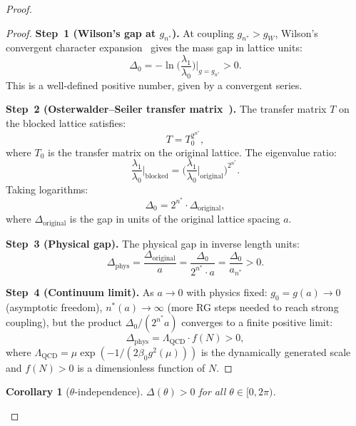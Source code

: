 \documentclass[12pt,a4paper]{article}
\theoremstyle{plain}
\newtheorem{corollary}[theorem]{Corollary}
\theoremstyle{definition}
\theoremstyle{remark}
\begin{document}
\begin{proof}
\begin{proof}
\textbf{Step~1 (Wilson's gap at $g_{n^*}$).} At coupling $g_{n^*}>g_W$, Wilson's convergent character expansion~\cite{Wilson1974} gives the mass gap in lattice units:
\begin{equation}\label{eq:Delta0}
\Delta_0 = -\ln\!\Big(\frac{\lambda_1}{\lambda_0}\Big)\bigg|_{g=g_{n^*}} > 0.
\end{equation}
This is a well-defined positive number, given by a convergent series.

\textbf{Step~2 (Osterwalder--Seiler transfer matrix~\cite{OsterwalderSeiler1978}).} The transfer matrix $T$ on the blocked lattice satisfies:
\begin{equation}\label{eq:OS_transfer}
T = T_0^{2^{n^*}},
\end{equation}
where $T_0$ is the transfer matrix on the original lattice. The eigenvalue ratio:
\begin{equation}\label{eq:eigenratio}
\frac{\lambda_1}{\lambda_0}\bigg|_{\text{blocked}} = \bigg(\frac{\lambda_1}{\lambda_0}\bigg|_{\text{original}}\bigg)^{\!2^{n^*}}.
\end{equation}
Taking logarithms:
\begin{equation}\label{eq:gap_relation}
\Delta_0 = 2^{n^*}\cdot\Delta_{\mathrm{original}},
\end{equation}
where $\Delta_{\mathrm{original}}$ is the gap in units of the original lattice spacing $a$.

\textbf{Step~3 (Physical gap).} The physical gap in inverse length units:
\begin{equation}\label{eq:phys_gap}
\Delta_{\mathrm{phys}} = \frac{\Delta_{\mathrm{original}}}{a} = \frac{\Delta_0}{2^{n^*}\cdot a} = \frac{\Delta_0}{a_{n^*}} > 0.
\end{equation}

\textbf{Step~4 (Continuum limit).} As $a\to 0$ with physics fixed: $g_0=g(a)\to 0$ (asymptotic freedom), $n^*(a)\to\infty$ (more RG steps needed to reach strong coupling), but the product $\Delta_0/(2^{n^*}a)$ converges to a finite positive limit:
\begin{equation}\label{eq:continuum_gap}
\Delta_{\mathrm{phys}} = \Lambda_{\mathrm{QCD}}\cdot f(N) > 0,
\end{equation}
where $\Lambda_{\mathrm{QCD}}=\mu\exp(-1/(2\beta_0 g^2(\mu)))$ is the dynamically generated scale and $f(N)>0$ is a dimensionless function of $N$.
\end{proof}

\begin{corollary}[$\theta$-independence]\label{cor:theta}
$\Delta(\theta)>0$ for all $\theta\in[0,2\pi)$.
\end{corollary}


\end{proof}
\end{document}

